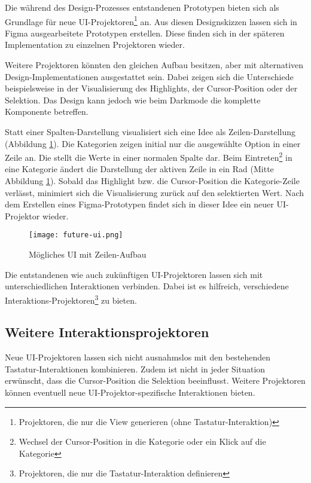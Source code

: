 Die während des Design-Prozesses entstandenen Prototypen bieten sich als Grundlage für neue UI-Projektoren\footnote{
    Projektoren, die nur die View generieren (ohne Tastatur-Interaktion)
} an. 
Aus diesen Designskizzen lassen sich in Figma ausgearbeitete Prototypen erstellen. 
Diese finden sich in der späteren Implementation zu einzelnen Projektoren wieder. 

Weitere Projektoren könnten den gleichen Aufbau besitzen, aber mit alternativen Design-Implementationen ausgestattet sein. 
Dabei zeigen sich die Unterschiede beispielsweise in der Visualisierung des Highlights, der Cursor-Position oder der Selektion. 
Das Design kann jedoch wie beim Darkmode die komplette Komponente betreffen. 

Statt einer Spalten-Darstellung visualisiert sich eine Idee als Zeilen-Darstellung (Abbildung \ref{img:futureUi}). 
Die Kategorien zeigen initial nur die ausgewählte Option in einer Zeile an. 
Die  stellt die Werte in einer normalen Spalte dar. 
Beim Eintreten\footnote{
    Wechsel der Cursor-Position in die Kategorie oder ein Klick auf die Kategorie
} in eine Kategorie ändert die Darstellung der aktiven Zeile in ein Rad (Mitte Abbildung \ref{img:futureUi}). 
Sobald das Highlight bzw. die Cursor-Position die Kategorie-Zeile verlässt, minimiert sich die Visualisierung zurück auf den selektierten Wert. 
Nach dem Erstellen eines Figma-Prototypen findet sich in dieser Idee ein neuer UI-Projektor wieder. 

\begin{figure}[!htb]
    \centering
    \texttt{[image: future-ui.png]}
    \caption{\centering Mögliches UI mit Zeilen-Aufbau}
    \label{img:futureUi}
\end{figure}

Die entstandenen wie auch zukünftigen UI-Projektoren lassen sich mit unterschiedlichen Interaktionen verbinden. 
Dabei ist es hilfreich, verschiedene Interaktions-Pro\-jek\-toren\footnote{
    Projektoren, die nur die Tastatur-Interaktion definieren
} zu bieten. 


\subsection{Weitere Interaktionsprojektoren}
\label{sec:moreInteraction}

Neue UI-Projektoren lassen sich nicht ausnahmslos mit den bestehenden Tastatur-Inter\-aktionen kombinieren. 
Zudem ist nicht in jeder Situation erwünscht, dass die Cursor-Position die Selektion beeinflusst. 
Weitere Projektoren können eventuell neue UI-Pro\-jektor-spezifische Interaktionen bieten. 

